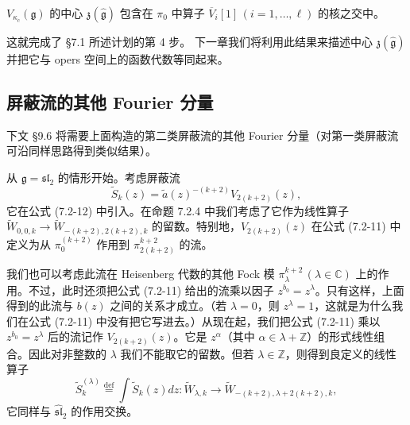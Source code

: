 \begin{proposition}
    $V_{\kappa_c}(\mathfrak{g})$ 的中心 $\mathfrak{z}(\hat{\mathfrak{g}})$ 包含在 $\pi_0$ 中算子 $\overline{V}_i[1]\,(i=1,\dots,\ell)$ 的核之交中。
\end{proposition}

这就完成了 §7.1 所述计划的第 4 步。
下一章我们将利用此结果来描述中心 $\mathfrak{z}(\hat{\mathfrak{g}})$ 并把它与 opers 空间上的函数代数等同起来。


\subsection{屏蔽流的其他 Fourier 分量}

下文 §9.6 将需要上面构造的第二类屏蔽流的其他 Fourier 分量（对第一类屏蔽流可沿同样思路得到类似结果）。

从 $\mathfrak{g}=\mathfrak{sl}_2$ 的情形开始。考虑屏蔽流
\[
    \widetilde{S}_k(z)=\widetilde{a}(z)^{-(k+2)}V_{2(k+2)}(z),
\]
它在公式 (7.2-12) 中引入。在命题 7.2.4 中我们考虑了它作为线性算子 $\widetilde{W}_{0,0,k}\to\widetilde{W}_{-(k+2),2(k+2),k}$ 的留数。特别地，$V_{2(k+2)}(z)$ 在公式 (7.2-11) 中定义为从 $\pi_0^{(k+2)}$ 作用到 $\pi_{2(k+2)}^{k+2}$ 的流。

我们也可以考虑此流在 Heisenberg 代数的其他 Fock 模 $\pi_\lambda^{k+2}\,(\lambda\in\mathbb{C})$ 上的作用。不过，此时还须把公式 (7.2-11) 给出的流乘以因子 $z^{b_0}=z^\lambda$。只有这样，上面得到的此流与 $b(z)$ 之间的关系才成立。（若 $\lambda=0$，则 $z^\lambda=1$，这就是为什么我们在公式 (7.2-11) 中没有把它写进去。）从现在起，我们把公式 (7.2-11) 乘以 $z^{b_0}=z^\lambda$ 后的流记作 $V_{2(k+2)}(z)$。它是 $z^\alpha$（其中 $\alpha\in\lambda+\mathbb{Z}$）的形式线性组合。因此对非整数的 $\lambda$ 我们不能取它的留数。但若 $\lambda\in\mathbb{Z}$，则得到良定义的线性算子
\begin{equation}
    \widetilde{S}^{(\lambda)}_k\overset{\mathrm{def}}{=}\int\widetilde{S}_k(z)dz:
    \widetilde{W}_{\lambda,k}\longrightarrow\widetilde{W}_{-(k+2),\lambda+2(k+2),k},
    \tag{7.3-15}
\end{equation}
它同样与 $\widehat{\mathfrak{sl}}_2$ 的作用交换。


